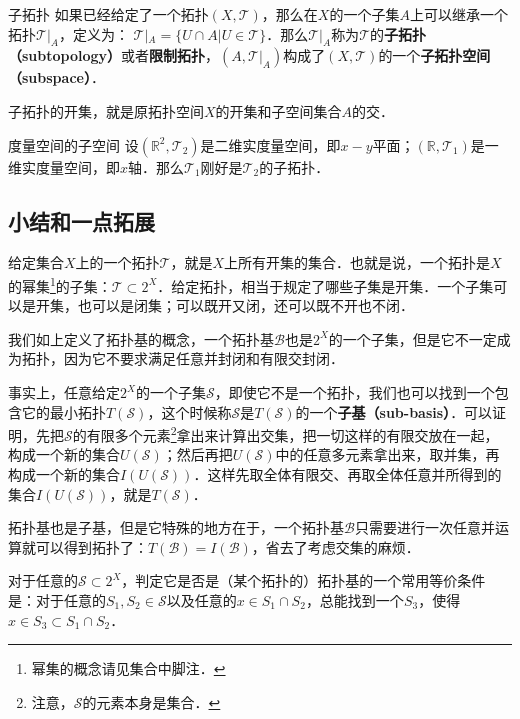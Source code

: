 \begin{definition}{子拓扑}\label{Topol_def3}
如果已经给定了一个拓扑$(X, \mathcal{T})$，那么在$X$的一个子集$A$上可以继承一个拓扑$\mathcal{T}|_A$，定义为：
$\mathcal{T}|_A=\{U\cap A|U\in \mathcal{T}\}$．那么$\mathcal{T}|_A$称为$\mathcal{T}$的\textbf{子拓扑（subtopology）}或者\textbf{限制拓扑}，$(A, \mathcal{T}|_A)$构成了$(X, \mathcal{T})$的一个\textbf{子拓扑空间（subspace）}．
\end{definition}

子拓扑的开集，就是原拓扑空间$X$的开集和子空间集合$A$的交．

\begin{example}{度量空间的子空间}
设$(\mathbb{R}^2, \mathcal{T}_2)$是二维实度量空间，即$x-y$平面；$(\mathbb{R}, \mathcal{T}_1)$是一维实度量空间，即$x$轴．那么$\mathcal{T}_1$刚好是$\mathcal{T}_2$的子拓扑．
\end{example}

\subsection{小结和一点拓展}

给定集合$X$上的一个拓扑$\mathcal{T}$，就是$X$上所有开集的集合．也就是说，一个拓扑是$X$的幂集\footnote{幂集的概念请见集合中脚注．}的子集：$\mathcal{T}\subset 2^X$．给定拓扑，相当于规定了哪些子集是开集．一个子集可以是开集，也可以是闭集；可以既开又闭，还可以既不开也不闭．

我们如上定义了拓扑基的概念，一个拓扑基$\mathcal{B}$也是$2^X$的一个子集，但是它不一定成为拓扑，因为它不要求满足任意并封闭和有限交封闭．

事实上，任意给定$2^X$的一个子集$\mathcal{S}$，即使它不是一个拓扑，我们也可以找到一个包含它的最小拓扑$T(\mathcal{S})$，这个时候称$\mathcal{S}$是$T(\mathcal{S})$的一个\textbf{子基（sub-basis）}．可以证明，先把$\mathcal{S}$的有限多个元素\footnote{注意，$\mathcal{S}$的元素本身是集合．}拿出来计算出交集，把一切这样的有限交放在一起，构成一个新的集合$U(\mathcal{S})$；然后再把$U(\mathcal{S})$中的任意多元素拿出来，取并集，再构成一个新的集合$I(U(\mathcal{S}))$．这样先取全体有限交、再取全体任意并所得到的集合$I(U(\mathcal{S}))$，就是$T(\mathcal{S})$．

拓扑基也是子基，但是它特殊的地方在于，一个拓扑基$\mathcal{B}$只需要进行一次任意并运算就可以得到拓扑了：$T(\mathcal{B})=I(\mathcal{B})$，省去了考虑交集的麻烦．

对于任意的$\mathcal{S}\subset2^X$，判定它是否是（某个拓扑的）拓扑基的一个常用等价条件是：对于任意的$S_1, S_2\in \mathcal{S}$以及任意的$x\in S_1\cap S_2$，总能找到一个$S_3$，使得$x\in S_3\subset S_1\cap S_2$．
